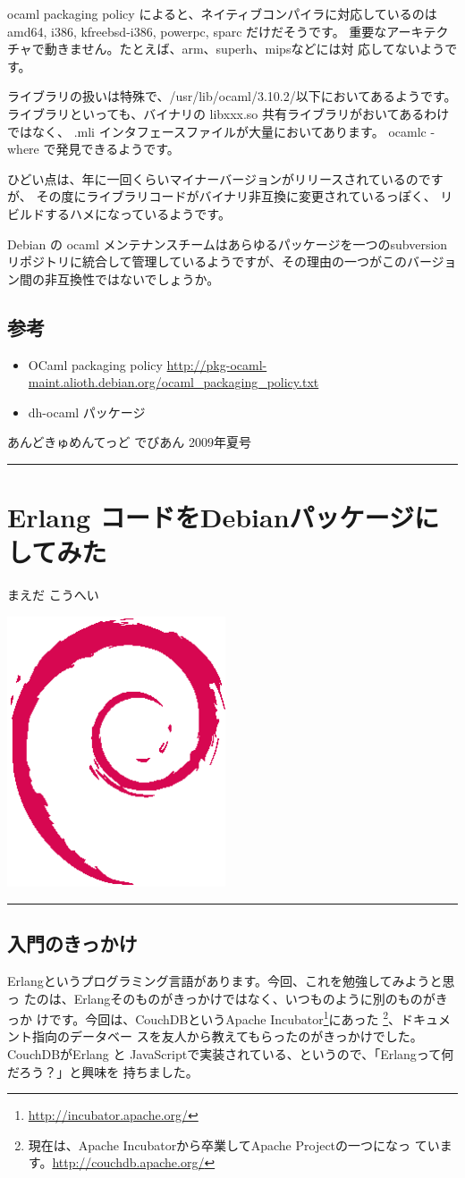 \documentclass[mingoth,a4paper]{jsarticle}
\renewcommand{\dancersection}[2]{%
\newpage
あんどきゅめんてっど でびあん 2009年夏号
%
\vspace{0.1mm}\\
{\color{dancerlightblue}\rule{\hsize}{2mm}}

%
%
\begin{minipage}[t]{0.6\hsize}
\color{dancerdarkblue}
\vspace{1cm}
\section{#1}
\hfill{}#2\\
\end{minipage}
\begin{minipage}[t]{0.4\hsize}
\vspace{-2cm}
\hfill{}\includegraphics[height=8cm]{image200502/openlogo-nd.eps}\\
\vspace{-5cm}
\end{minipage}
%
%
{\color{dancerdarkblue}\rule{0.74\hsize}{2mm}}
%
\vspace{2cm}
}
\begin{document}
ocaml packaging policy によると、ネイティブコンパイラに対応しているのは
amd64, i386, kfreebsd-i386, powerpc, sparc だけだそうです。
重要なアーキテクチャで動きません。たとえば、arm、superh、mipsなどには対
応してないようです。

ライブラリの扱いは特殊で、/usr/lib/ocaml/3.10.2/以下においてあるようです。
ライブラリといっても、バイナリの libxxx.so 共有ライブラリがおいてあるわけではなく、
.mli インタフェースファイルが大量においてあります。
ocamlc -where で発見できるようです。


ひどい点は、年に一回くらいマイナーバージョンがリリースされているのですが、
その度にライブラリコードがバイナリ非互換に変更されているっぽく、
リビルドするハメになっているようです。

Debian の ocaml メンテナンスチームはあらゆるパッケージを一つのsubversion
リポジトリに統合して管理しているようですが、その理由の一つがこのバージョ
ン間の非互換性ではないでしょうか。

\subsection{参考}
\begin{itemize}
 \item OCaml packaging policy
       \url{http://pkg-ocaml-maint.alioth.debian.org/ocaml_packaging_policy.txt}
 \item dh-ocaml パッケージ
\end{itemize}

\dancersection{Erlang コードをDebianパッケージにしてみた}{まえだ こうへい}

\subsection{入門のきっかけ}
Erlangというプログラミング言語があります。今回、これを勉強してみようと思っ
たのは、Erlangそのものがきっかけではなく、いつものように別のものがきっか
けです。今回は、CouchDBというApache
Incubator\footnote{\url{http://incubator.apache.org/}}にあった
\footnote{現在は、Apache Incubatorから卒業してApache Projectの一つになっ
ています。\url{http://couchdb.apache.org/}}、ドキュメント指向のデータベー
スを友人から教えてもらったのがきっかけでした。CouchDBがErlang と
JavaScriptで実装されている、というので、「Erlangって何だろう？」と興味を
持ちました。
\end{document}
